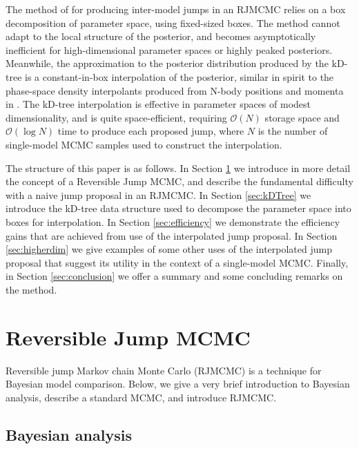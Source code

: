 \documentclass{iopart}
\newcommand{\order}[1]{\mathcal{O}\left( #1 \right)}
\begin{document}
The method of \cite{Littenberg2009} for producing inter-model jumps in
an RJMCMC relies on a box decomposition of parameter space, using
fixed-sized boxes.  The method cannot adapt to the local structure of
the posterior, and becomes asymptotically inefficient for
high-dimensional parameter spaces or highly peaked posteriors.
Meanwhile, the approximation to the posterior distribution produced by
the kD-tree is a constant-in-box interpolation of the posterior,
similar in spirit to the phase-space density interpolants produced
from N-body positions and momenta in \cite{Ascasibar2005}.  The
kD-tree interpolation is effective in parameter spaces of modest
dimensionality, and is quite space-efficient, requiring $\order{N}$
storage space and $\order{\log N}$ time to produce each proposed jump,
where $N$ is the number of single-model MCMC samples used to construct
the interpolation.

The structure of this paper is as follows.  In Section
\ref{sec:reversible-jump} we introduce in more detail the concept of a
Reversible Jump MCMC, and describe the fundamental difficulty with a
naive jump proposal in an RJMCMC.  In Section \ref{sec:kDTree} we
introduce the kD-tree data structure used to decompose the parameter
space into boxes for interpolation.  In Section \ref{sec:efficiency}
we demonstrate the efficiency gains that are achieved from use of the
interpolated jump proposal.  In Section \ref{sec:higherdim} we give
examples of some other uses of the interpolated jump proposal that
suggest its utility in the context of a single-model MCMC.  Finally,
in Section \ref{sec:conclusion} we offer a summary and some concluding
remarks on the method.

\section{Reversible Jump MCMC}
\label{sec:reversible-jump}

Reversible jump Markov chain Monte Carlo (RJMCMC) \cite{Green1995} is
a technique for Bayesian model comparison.  Below, we give a very
brief introduction to Bayesian analysis, describe a standard MCMC, and
introduce RJMCMC.

\subsection{Bayesian analysis}
\end{document}
